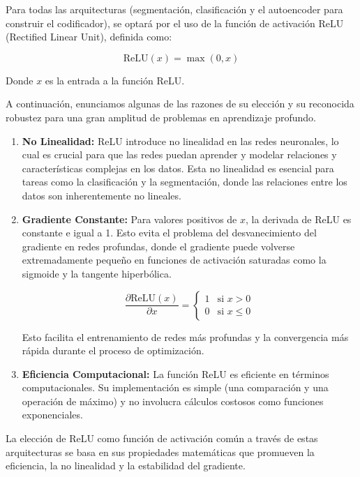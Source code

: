 Para todas las arquitecturas (segmentación, clasificación y el autoencoder para construir el codificador), se optará por el uso de la función de activación ReLU (Rectified Linear Unit), definida como:

$$ \text{ReLU}(x) = \max(0, x) $$

Donde \( x \) es la entrada a la función ReLU.

A continuación, enunciamos algunas de las razones de su elección y su reconocida robustez para una gran amplitud de problemas en aprendizaje profundo.

\begin{enumerate}
	\item \textbf{No Linealidad:}
	ReLU introduce no linealidad en las redes neuronales, lo cual es crucial para que las redes puedan aprender y modelar relaciones y características complejas en los datos. Esta no linealidad es esencial para tareas como la clasificación y la segmentación, donde las relaciones entre los datos son inherentemente no lineales.
	
	\item \textbf{Gradiente Constante:}
	Para valores positivos de $ x $, la derivada de ReLU es constante e igual a 1. Esto evita el problema del desvanecimiento del gradiente en redes profundas, donde el gradiente puede volverse extremadamente pequeño en funciones de activación saturadas como la sigmoide y la tangente hiperbólica.
	
	\[ \frac{\partial \text{ReLU}(x)}{\partial x} = \begin{cases} 
		1 & \text{si } x > 0 \\
		0 & \text{si } x \leq 0 
	\end{cases} \]
	
	Esto facilita el entrenamiento de redes más profundas y la convergencia más rápida durante el proceso de optimización.
	
	\item \textbf{Eficiencia Computacional:}
	La función ReLU es eficiente en términos computacionales. Su implementación es simple (una comparación y una operación de máximo) y no involucra cálculos costosos como funciones exponenciales.
	
\end{enumerate}

La elección de ReLU como función de activación común a través de estas arquitecturas se basa en sus propiedades matemáticas que promueven la eficiencia, la no linealidad y la estabilidad del gradiente.

